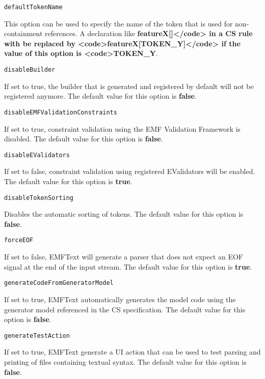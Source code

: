 \noindent\texttt{defaultTokenName}
\begin{myindentpar}{1cm}
This option can be used to specify the name of the token that is used for non-containment references. A declaration like \textbf{featureX[]</code> in a CS rule with be replaced by <code>featureX[TOKEN_Y]</code> if the value of this option is <code>TOKEN_Y}.
\end{myindentpar}

\noindent\texttt{disableBuilder}
\begin{myindentpar}{1cm}
If set to true, the builder that is generated and registered by default will not be registered anymore. The default value for this option is \textbf{false}.
\end{myindentpar}

\noindent\texttt{disableEMFValidationConstraints}
\begin{myindentpar}{1cm}
If set to true, constraint validation using the EMF Validation Framework is disabled. The default value for this option is \textbf{false}.
\end{myindentpar}

\noindent\texttt{disableEValidators}
\begin{myindentpar}{1cm}
If set to false, constraint validation using registered EValidators will be enabled. The default value for this option is \textbf{true}.
\end{myindentpar}

\noindent\texttt{disableTokenSorting}
\begin{myindentpar}{1cm}
Disables the automatic sorting of tokens. The default value for this option is \textbf{false}.
\end{myindentpar}

\noindent\texttt{forceEOF}
\begin{myindentpar}{1cm}
If set to false, EMFText will generate a parser that does not expect an EOF signal at the end of the input stream. The default value for this option is \textbf{true}.
\end{myindentpar}

\noindent\texttt{generateCodeFromGeneratorModel}
\begin{myindentpar}{1cm}
If set to true, EMFText automatically generates the model code using the generator model referenced in the CS specification. The default value for this option is \textbf{false}.
\end{myindentpar}

\noindent\texttt{generateTestAction}
\begin{myindentpar}{1cm}
If set to true, EMFText generate a UI action that can be used to test parsing and printing of files containing textual syntax. The default value for this option is \textbf{false}.
\end{myindentpar}

